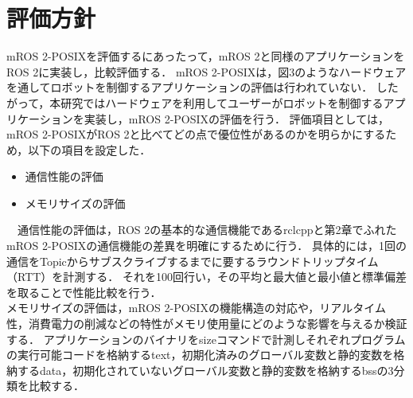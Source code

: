 \documentclass[11pt]{ujarticle}
\begin{document}
\section{評価方針}
mROS 2-POSIXを評価するにあったって，mROS 2と同様のアプリケーションをROS 2に実装し，比較評価する．
mROS 2-POSIXは，図3のようなハードウェアを通してロボットを制御するアプリケーションの評価は行われていない．
したがって，本研究ではハードウェアを利用してユーザーがロボットを制御するアプリケーションを実装し，mROS 2-POSIXの評価を行う．
評価項目としては，mROS 2-POSIXがROS 2と比べてどの点で優位性があるのかを明らかにするため，以下の項目を設定した．
\begin{itemize}
	\item 通信性能の評価
	\item メモリサイズの評価
\end{itemize}
　通信性能の評価は，ROS 2の基本的な通信機能であるrclcppと第2章でふれたmROS 2-POSIXの通信機能の差異を明確にするために行う．
具体的には，1回の通信をTopicからサブスクライブするまでに要するラウンドトリップタイム（RTT）を計測する．
それを100回行い，その平均と最大値と最小値と標準偏差を取ることで性能比較を行う．
\\メモリサイズの評価は，mROS 2-POSIXの機能構造の対応や，リアルタイム性，消費電力の削減などの特性がメモリ使用量にどのような影響を与えるか検証する．
アプリケーションのバイナリをsizeコマンドで計測しそれぞれプログラムの実行可能コードを格納するtext，初期化済みのグローバル変数と静的変数を格納するdata，初期化されていないグローバル変数と静的変数を格納するbssの3分類を比較する．
\end{document}
